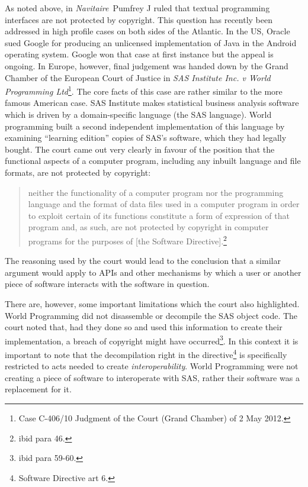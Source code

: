 \documentclass[a4paper,12pt]{article}
\newcommand{\SD}[1][]{Software Directive #1\xspace}
\begin{document}
As noted above, in \textit{Navitaire}\ Pumfrey J ruled that textual
programming interfaces are not protected by copyright. This question has
recently been addressed in high profile cases on both sides of the
Atlantic. In the US, Oracle sued Google for producing an unlicensed
implementation of Java in the Android operating system. Google won that case
at first instance but the appeal is ongoing. In Europe, however, final
judgement was handed down by the Grand Chamber of the European Court of
Justice in \textit{SAS Institute Inc. v World Programming
  Ltd}\footnote{Case C-406/10 Judgment of the Court (Grand Chamber) of 2
  May 2012.}. The core facts of this case are rather similar to the more
famous American case. SAS Institute makes statistical business analysis
software which is driven by a domain-specific language (the SAS
language). World programming built a second independent implementation of
this language by examining ``learning edition'' copies of SAS's software, which they
had legally bought. The court came out very clearly in favour of the
position that the functional aspects of a computer program, including any
inbuilt language and file formats, are not protected by copyright:
\begin{quotation}
  neither the functionality of a computer program nor the programming
  language and the format of data files used in a computer program in order
  to exploit certain of its functions constitute a form of expression of
  that program and, as such, are not protected by copyright in computer
  programs for the purposes of [the Software Directive].\footnote{ibid para 46.}
\end{quotation}
The reasoning used by the court would lead to the conclusion that a similar
argument would apply to APIs and other mechanisms by which a user or another
piece of software interacts with the software in question. 

There are, however, some important limitations which the court also
highlighted. World Programming did not disassemble or decompile the SAS object
code. The court noted that, had they done so and used this information to
create their implementation, a breach of copyright might have
occurred\footnote{ibid para 59-60.}. In
this context it is important to note that the decompilation right in the
directive\footnote{\SD[art 6].} is specifically restricted to acts needed to
create \emph{interoperability}. World Programming were not creating a piece
of software to interoperate with SAS, rather their software was a
replacement for it.
\end{document}
